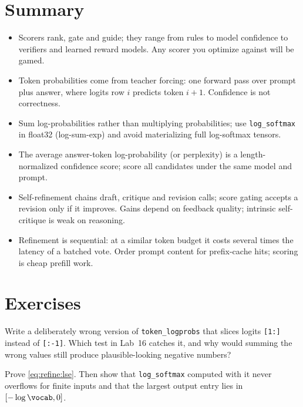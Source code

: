 \section{Summary}
\begin{itemize}
  \item Scorers rank, gate and guide; they range from rules to model confidence to verifiers and
  learned reward models. Any scorer you optimize against will be gamed.
  \item Token probabilities come from teacher forcing: one forward pass over prompt plus answer,
  where logits row $i$ predicts token $i{+}1$. Confidence is not correctness.
  \item Sum log-probabilities rather than multiplying probabilities; use \texttt{log\_softmax} in
  float32 (log-sum-exp) and avoid materializing full log-softmax tensors.
  \item The average answer-token log-probability (or perplexity) is a length-normalized confidence
  score; score all candidates under the same model and prompt.
  \item Self-refinement chains draft, critique and revision calls; score gating accepts a revision
  only if it improves. Gains depend on feedback quality; intrinsic self-critique is weak on reasoning.
  \item Refinement is sequential: at a similar token budget it costs several times the latency of a
  batched vote. Order prompt content for prefix-cache hits; scoring is cheap prefill work.
\end{itemize}

\section{Exercises}

\begin{exercise}
Write a deliberately wrong version of \texttt{token\_logprobs} that slices logits \texttt{[1:]}
instead of \texttt{[:-1]}. Which test in Lab~16 catches it, and why would summing the wrong values
still produce plausible-looking negative numbers?
\end{exercise}

\begin{exercise}
Prove \cref{eq:refine:lse}. Then show that \texttt{log\_softmax} computed with it never overflows for
finite inputs and that the largest output entry lies in $[-\log \vocab, 0]$.
\end{exercise}

